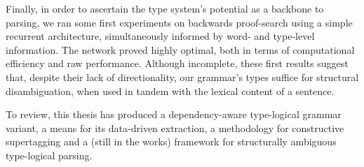 Finally, in order to ascertain the type system's potential as a backbone to parsing, we ran some first experiments on backwards proof-search using a simple recurrent architecture, simultaneously informed by word- and type-level information.
The network proved highly optimal, both in terms of computational efficiency and raw performance.
Although incomplete, these first results suggest that, despite their lack of directionality, our grammar's types suffice for structural disambiguation, when used in tandem with the lexical content of a sentence.

To review, this thesis has produced a dependency-aware type-logical grammar variant, a means for its data-driven extraction, a methodology for constructive supertagging and a (still in the works) framework for structurally ambiguous type-logical parsing.
